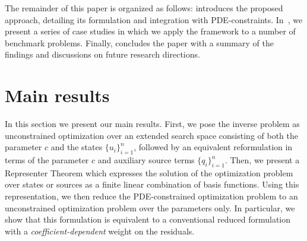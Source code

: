 \documentclass[12pt]{amsart}
\begin{document}
The remainder of this paper is organized as follows:  introduces the proposed approach, detailing its formulation and integration with PDE-constraints. In~, we present a series of case studies in which we apply the framework to a number of benchmark problems. Finally,  concludes the paper with a summary of the findings and discussions on future research directions.

\section{Main results}\label{sec:theory}
In this section we present our main results. First, we pose the inverse problem as unconstrained optimization over an extended search space consisting of both the parameter $c$ and the states $\{u_i\}_{i=1}^n$, followed by an equivalent reformulation in terms of the parameter $c$ and auxiliary source terms $\{q_i\}_{i=1}^n$. Then, we present a Representer Theorem which expresses the solution of the optimization problem over states or sources as a finite linear combination of basis functions. Using this representation, we then reduce the PDE-constrained optimization problem to an unconstrained optimization problem over the parameters only. In particular, we show that this formulation is equivalent to a conventional reduced formulation with a \textit{coefficient-dependent} weight on the residuals.
\end{document}
